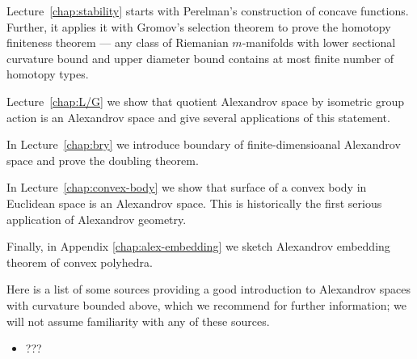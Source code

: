 Lecture~\ref{chap:stability} starts with Perelman's construction of concave functions.
Further, it applies it with Gromov's selection theorem to prove the homotopy finiteness theorem --- any class of Riemanian $m$-manifolds with lower sectional curvature bound and upper diameter bound contains at most finite number of homotopy types.

Lecture~\ref{chap:L/G} we show that quotient Alexandrov space by isometric group action is an Alexandrov space and give several applications of this statement.

In Lecture~\ref{chap:bry} we introduce boundary of finite-dimensioanal Alexandrov space and prove the doubling theorem.

In Lecture~\ref{chap:convex-body} we show that surface of a convex body in Euclidean space is an Alexandrov space. This is historically the first serious application of Alexandrov geometry.

Finally, in Appendix \ref{chap:alex-embedding}
 we sketch Alexandrov embedding theorem of convex polyhedra.

\medskip

Here is a list of some sources providing a good introduction to Alexandrov spaces with curvature bounded above, which we recommend for further information;
we will not assume familiarity with any of these sources.

\begin{itemize}
\item ???
\end{itemize}
